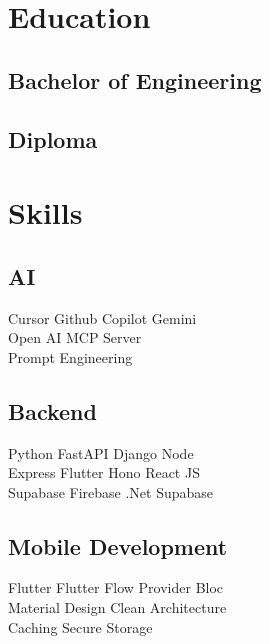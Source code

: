 \documentclass[]{deedy-resume-reversed}
\begin{document}
\begin{minipage}[t]{0.33\textwidth}

\section{Education}

\subsection{Bachelor of Engineering}
\sectionsep

\subsection{Diploma}
\sectionsep

\section{Skills}

\subsection{AI}
Cursor \textbullet Github Copilot \textbullet Gemini\\
Open AI \textbullet MCP Server \\
Prompt Engineering 
\sectionsep

\subsection{Backend}
Python \textbullet FastAPI \textbullet Django \textbullet Node \\
Express \textbullet Flutter \textbullet Hono \textbullet React JS \\
Supabase \textbullet Firebase \textbullet .Net \textbullet Supabase \\
\sectionsep

\subsection{Mobile Development}
Flutter \textbullet \textbullet Flutter Flow \textbullet Provider \textbullet Bloc \\
Material Design \textbullet Clean Architecture \\
Caching \textbullet Secure Storage \\
\sectionsep


\end{minipage}
\end{document}
